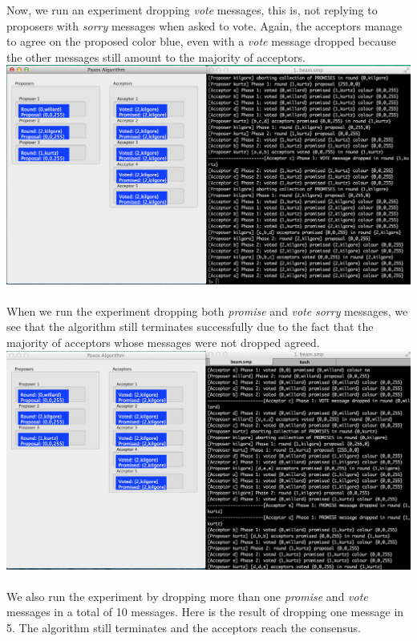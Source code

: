 \documentclass[a4paper, 11pt]{article}
\begin{document}
Now, we run an experiment dropping \textit{vote} messages, this is, not replying to proposers with \textit{sorry} messages when asked to vote. Again, the acceptors manage to agree on the proposed color blue, even with a \textit{vote} message dropped because the other messages still amount to the majority of acceptors.\\

\includegraphics[scale=0.35]{images/exp6.png} \\\\

When we run the experiment dropping both \textit{promise} and \textit{vote} \textit{sorry} messages, we see that the algorithm still terminates successfully due to the fact that the majority of acceptors whose messages were not dropped agreed.\\

\includegraphics[scale=0.35]{images/exp7.png} \\\\

We also run the experiment by dropping more than one \textit{promise} and \textit{vote} messages in a total of 10 messages. Here is the result of dropping one message in 5. The algorithm still terminates and the acceptors reach the consensus.\\
\end{document}
